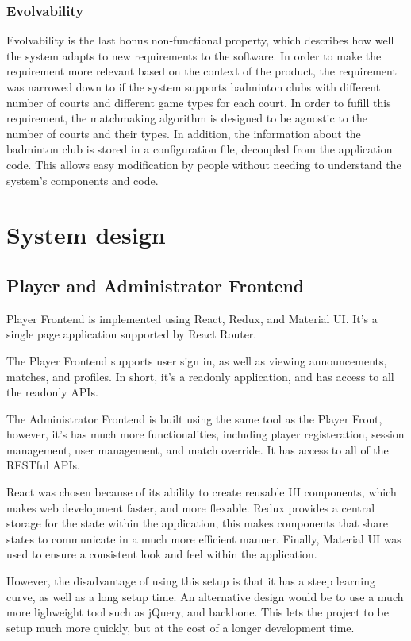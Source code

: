 \documentclass{article}
\begin{document}
\subsubsection{Evolvability}
Evolvability is the last bonus non-functional property, which describes how well the system adapts to new requirements to the software. In order to make the requirement more relevant based on the context of the product, the requirement was narrowed down to if the system supports badminton clubs with different number of courts and different game types for each court. In order to fufill this requirement, the matchmaking algorithm is designed to be agnostic to the number of courts and their types. In addition, the information about the badminton club is stored in a configuration file, decoupled from the application code. This allows easy modification by people without needing to understand the system's components and code.

\section{System design}

\subsection{Player and Administrator Frontend}
Player Frontend is implemented using React, Redux, and Material UI. It's a single page application supported by React Router.

The Player Frontend supports user sign in, as well as viewing announcements, matches, and profiles. In short, it's a readonly application, and has access to all the readonly APIs.

The Administrator Frontend is built using the same tool as the Player Front, however, it's has much more functionalities, including player registeration, session management, user management, and match override. It has access to all of the RESTful APIs.

React was chosen because of its ability to create reusable UI components, which makes web development faster, and more flexable. Redux provides a central storage for the state within the application, this makes components that share states to communicate in a much more efficient manner. Finally, Material UI was used to ensure a consistent look and feel within the application.

However, the disadvantage of using this setup is that it has a steep learning curve, as well as a long setup time. An alternative design would be to use a much more lighweight tool such as jQuery, and backbone. This lets the project to be setup much more quickly, but at the cost of a longer development time.
\end{document}
